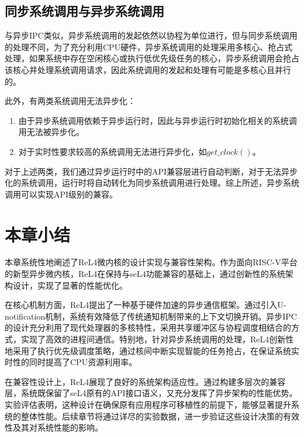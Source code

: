 \subsection{同步系统调用与异步系统调用}
与异步IPC类似，异步系统调用的发起依然以协程为单位进行，但与同步系统调用的处理不同，为了充分利用CPU硬件，异步系统调用的处理采用多核心、抢占式处理，如果系统中存在空闲核心或执行低优先级任务的核心，异步系统调用会抢占该核心并处理系统调用请求，因此系统调用的发起和处理有可能是多核心且并行的。

此外，有两类系统调用无法异步化：
\begin{enumerate}
  \item 由于异步系统调用依赖于异步运行时，因此与异步运行时初始化相关的系统调用无法被异步化。
  \item 对于实时性要求较高的系统调用无法进行异步化，如$get\_clock()$。
\end{enumerate}

对于上述两类，我们通过异步运行时中的API兼容层进行自动判断，对于无法异步化的系统调用，运行时将自动转化为同步系统调用进行处理。综上所述，异步系统调用可以实现API级别的兼容。

\section{本章小结}
本章系统性地阐述了ReL4微内核的设计实现与兼容性架构。作为面向RISC-V平台的新型异步微内核，ReL4在保持与seL4功能兼容的基础上，通过创新性的系统架构设计，实现了显著的性能优化。

在核心机制方面，ReL4提出了一种基于硬件加速的异步通信框架。通过引入U-notification机制，系统有效降低了传统通知机制带来的上下文切换开销。异步IPC的设计充分利用了现代处理器的多核特性，采用共享缓冲区与协程调度相结合的方式，实现了高效的进程间通信。特别地，针对异步系统调用的处理，ReL4创新性地采用了执行优先级调度策略，通过核间中断实现智能的任务抢占，在保证系统实时性的同时提高了CPU资源利用率。

在兼容性设计上，ReL4展现了良好的系统架构适应性。通过构建多层次的兼容层，系统既保留了seL4原有的API接口语义，又充分发挥了异步架构的性能优势。实验评估表明，这种设计在确保原有应用程序可移植性的前提下，能够显著提升系统的整体性能。后续章节将通过详尽的实验数据，进一步验证这些设计决策的有效性及其对系统性能的影响。
